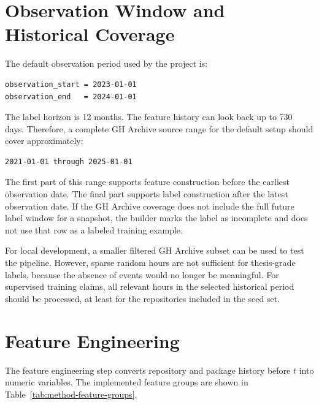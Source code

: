 \section{Observation Window and Historical Coverage}
\label{sec:method-observation-window}

The default observation period used by the project is:

\begin{verbatim}
observation_start = 2023-01-01
observation_end   = 2024-01-01
\end{verbatim}

The label horizon is 12 months. The feature history can look back up to 730 days. Therefore, a complete GH Archive source range for the default setup should cover approximately:

\begin{verbatim}
2021-01-01 through 2025-01-01
\end{verbatim}

The first part of this range supports feature construction before the earliest observation date. The final part supports label construction after the latest observation date. If the GH Archive coverage does not include the full future label window for a snapshot, the builder marks the label as incomplete and does not use that row as a labeled training example.

For local development, a smaller filtered GH Archive subset can be used to test the pipeline. However, sparse random hours are not sufficient for thesis-grade labels, because the absence of events would no longer be meaningful. For supervised training claims, all relevant hours in the selected historical period should be processed, at least for the repositories included in the seed set.

\section{Feature Engineering}
\label{sec:method-feature-engineering}

The feature engineering step converts repository and package history before \(t\) into numeric variables. The implemented feature groups are shown in Table~\ref{tab:method-feature-groups}.

